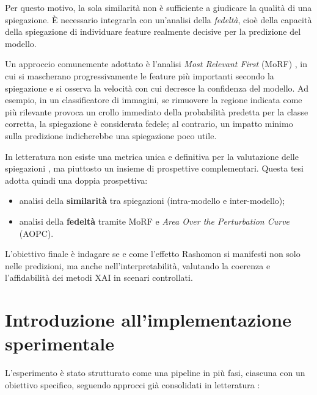 \documentclass{article}
\begin{document}
Per questo motivo, la sola similarità non è sufficiente a giudicare la qualità
di una spiegazione. È necessario integrarla con un’analisi della
\emph{fedeltà}, cioè della capacità della spiegazione di individuare feature
realmente decisive per la predizione del modello.

Un approccio comunemente adottato è l’analisi \emph{Most Relevant First} (MoRF)
\cite{samek2016evaluating}, in cui si mascherano progressivamente le feature
più importanti secondo la spiegazione e si osserva la velocità con cui decresce
la confidenza del modello. Ad esempio, in un classificatore di immagini, se
rimuovere la regione indicata come più rilevante provoca un crollo immediato
della probabilità predetta per la classe corretta, la spiegazione è considerata
fedele; al contrario, un impatto minimo sulla predizione indicherebbe una
spiegazione poco utile.

In letteratura non esiste una metrica unica e definitiva per la valutazione
delle spiegazioni \cite{adadi2018survey}, ma piuttosto un insieme di
prospettive complementari. Questa tesi adotta quindi una doppia prospettiva:
\begin{itemize}
      \item analisi della \textbf{similarità} tra spiegazioni (intra-modello e
            inter-modello);
      \item analisi della \textbf{fedeltà} tramite MoRF e \emph{Area Over the Perturbation
                  Curve} (AOPC).
\end{itemize}

L’obiettivo finale è indagare se e come l’effetto Rashomon si manifesti non
solo nelle predizioni, ma anche nell’interpretabilità, valutando la coerenza e
l’affidabilità dei metodi XAI in scenari controllati.

\section{Introduzione all’implementazione sperimentale}

L’esperimento è stato strutturato come una pipeline in più fasi, ciascuna con
un obiettivo specifico, seguendo approcci già consolidati in letteratura
\citep{mueller2023rashomon,leventi2023consistency,adadi2018survey}:
\end{document}
